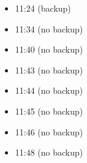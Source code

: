 
\begin{itemize}
\item 11:24 (backup)
\item 11:34 (no backup)
\item 11:40 (no backup)
\item 11:43 (no backup)
\item 11:44 (no backup)
\item 11:45 (no backup)
\item 11:46 (no backup)
\item 11:48 (no backup)
\end{itemize}
